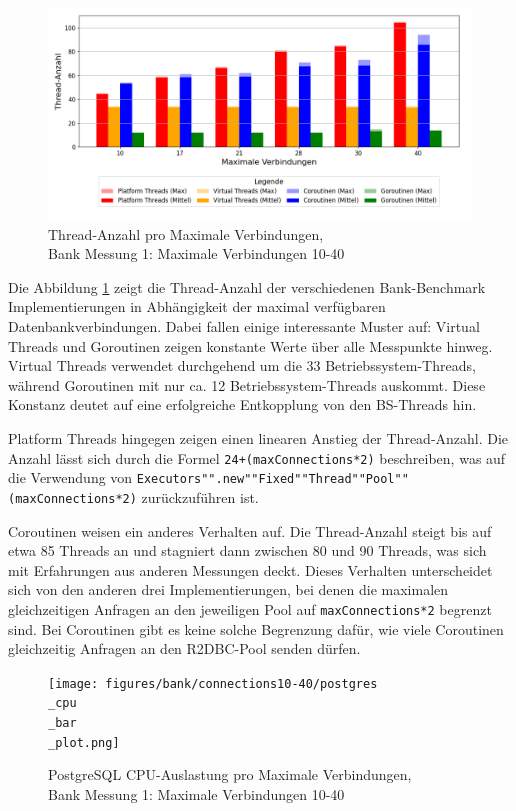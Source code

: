 \documentclass[fontsize=12pt,paper=a4,twoside=semi,parskip=half-,headsepline,headinclude]{scrreprt}
\begin{document}
\begin{figure}[H]
	\centering
	\includegraphics[scale=0.5]{figures/bank/connections10-40/num_threads_bar_plot.png}
	\caption{Thread-Anzahl pro Maximale Verbindungen,\\ Bank Messung 1: Maximale Verbindungen 10-40}
	\label{fig:bankConnThreads}
\end{figure}

Die Abbildung \ref{fig:bankConnThreads} zeigt die Thread-Anzahl der verschiedenen Bank-Benchmark Implementierungen in Abhängigkeit der maximal verfügbaren Datenbankverbindungen. Dabei fallen einige interessante Muster auf:
Virtual Threads und Goroutinen zeigen konstante Werte über alle Messpunkte hinweg. Virtual Threads verwendet durchgehend um die 33 Betriebssystem-Threads, während Goroutinen mit nur ca. 12 Betriebssystem-Threads auskommt. Diese Konstanz deutet auf eine erfolgreiche Entkopplung von den BS-Threads hin.

Platform Threads hingegen zeigen einen linearen Anstieg der Thread-Anzahl. Die Anzahl lässt sich durch die Formel \texttt{24+(maxConnections*2)} beschreiben, was auf die Verwendung von \texttt{Executors"".new""Fixed""Thread""Pool""(maxConnections*2)} zurückzuführen ist.

Coroutinen weisen ein anderes Verhalten auf. Die Thread-Anzahl steigt bis auf etwa 85 Threads an und stagniert dann zwischen 80 und 90 Threads, was sich mit Erfahrungen aus anderen Messungen deckt. Dieses Verhalten unterscheidet sich von den anderen drei Implementierungen, bei denen die maximalen gleichzeitigen Anfragen an den jeweiligen Pool auf \texttt{maxConnections*2} begrenzt sind. Bei Coroutinen gibt es keine solche Begrenzung dafür, wie viele Coroutinen gleichzeitig Anfragen an den R2DBC-Pool senden dürfen.

\begin{figure}[H]
	\centering
	\texttt{[image: figures/bank/connections10-40/postgres\\\_cpu\\\_bar\\\_plot.png]}
	\caption{PostgreSQL CPU-Auslastung pro Maximale Verbindungen,\\ Bank Messung 1: Maximale Verbindungen 10-40}
	\label{fig:bankConnPostgCPU}
\end{figure}
\end{document}
